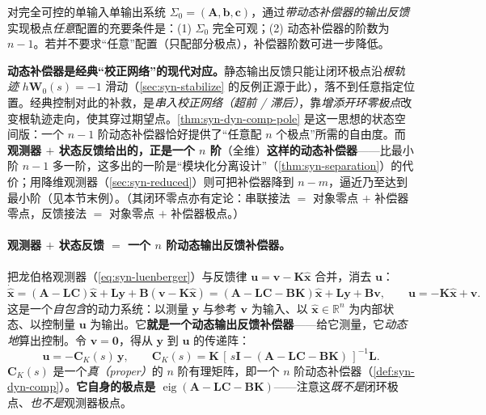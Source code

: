 \begin{theorem}[动态补偿器可突破静态输出反馈的极点配置极限]
\label{thm:syn-dyn-comp-pole}
对完全可控的单输入单输出系统 $\Sigma_0=(\mathbf A,\mathbf b,\mathbf c)$，通过\emph{带动态补偿器的输出反馈}实现极点\emph{任意}配置的充要条件是：(1) $\Sigma_0$ 完全可观；(2) 动态补偿器的阶数为 $n-1$\cite{liubao2006modern}。若并不要求“任意”配置（只配部分极点），补偿器阶数可进一步降低。
\end{theorem}

\begin{insight}
\textbf{动态补偿器是经典“校正网络”的现代对应。}\;静态输出反馈只能让闭环极点沿\emph{根轨迹} $h\mathbf W_0(s)=-1$ 滑动（\cref{sec:syn-stabilize} 的反例正源于此），落不到任意指定位置。经典控制对此的补救，是\emph{串入校正网络（超前 / 滞后）}，靠\emph{增添开环零极点}改变根轨迹走向，使其穿过期望点\cite{liubao2006modern}。\cref{thm:syn-dyn-comp-pole} 是这一思想的状态空间版：一个 $n-1$ 阶动态补偿器恰好提供了“任意配 $n$ 个极点”所需的自由度。而\textbf{观测器 $+$ 状态反馈给出的，正是一个 $n$ 阶}（全维）\textbf{这样的动态补偿器}——比最小阶 $n-1$ 多一阶，这多出的一阶是“模块化分离设计”（\cref{thm:syn-separation}）的代价；用降维观测器（\cref{sec:syn-reduced}）则可把补偿器降到 $n-m$，逼近乃至达到最小阶（见本节末例）。（其闭环零点亦有定论：串联接法 $=$ 对象零点 $+$ 补偿器零点，反馈接法 $=$ 对象零点 $+$ 补偿器极点\cite{liubao2006modern}。）
\end{insight}

\paragraph{观测器 $+$ 状态反馈 $=$ 一个 $n$ 阶动态输出反馈补偿器。}
把龙伯格观测器（\cref{eq:syn-luenberger}）与反馈律 $\mathbf u=\mathbf v-\mathbf K\hat{\mathbf x}$ 合并，消去 $\mathbf u$：
\begin{equation}
  \dot{\hat{\mathbf x}}=(\mathbf A-\mathbf L\mathbf C)\hat{\mathbf x}+\mathbf L\mathbf y+\mathbf B(\mathbf v-\mathbf K\hat{\mathbf x})=(\mathbf A-\mathbf L\mathbf C-\mathbf B\mathbf K)\hat{\mathbf x}+\mathbf L\mathbf y+\mathbf B\mathbf v,\qquad \mathbf u=-\mathbf K\hat{\mathbf x}+\mathbf v.
  \label{eq:syn-comp-state}
\end{equation}
这是一个\emph{自包含}的动力系统：以测量 $\mathbf y$ 与参考 $\mathbf v$ 为输入、以 $\hat{\mathbf x}\in\mathbb R^n$ 为内部状态、以控制量 $\mathbf u$ 为输出。它\textbf{就是一个动态输出反馈补偿器}——给它测量，它\emph{动态地}算出控制。令 $\mathbf v=\mathbf 0$，得从 $\mathbf y$ 到 $\mathbf u$ 的传递阵：
\begin{equation}
  \mathbf u=-\mathbf C_K(s)\,\mathbf y,\qquad \mathbf C_K(s)=\mathbf K\,[\,s\mathbf I-(\mathbf A-\mathbf L\mathbf C-\mathbf B\mathbf K)\,]^{-1}\mathbf L.
  \label{eq:syn-comp-tf}
\end{equation}
$\mathbf C_K(s)$ 是一个\emph{真（proper）}的 $n$ 阶有理矩阵，即一个 $n$ 阶动态补偿器（\cref{def:syn-dyn-comp}）\cite{chen1999linear,astrom2008feedback}。\textbf{它自身的极点是 $\operatorname{eig}(\mathbf A-\mathbf L\mathbf C-\mathbf B\mathbf K)$}——注意这\emph{既不是}闭环极点、\emph{也不是}观测器极点。

